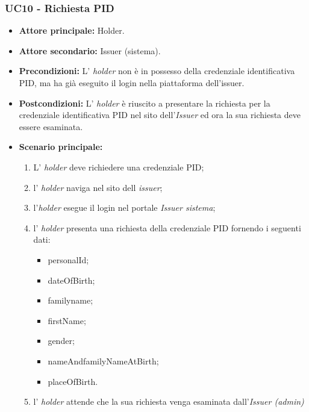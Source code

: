 \subsubsection{UC10 - Richiesta PID}
\begin{itemize}
\item \textbf{Attore principale:} Holder.
\item \textbf{Attore secondario:} Issuer (sistema). 
\item \textbf{Precondizioni:} L’ \textit{holder} non è in possesso della credenziale identificativa PID, ma ha già eseguito il login nella piattaforma dell'issuer.
\item \textbf{Postcondizioni:} L’ \textit{holder} è riuscito a presentare la richiesta per la credenziale identificativa PID nel sito dell'\textit{Issuer} ed ora la sua richiesta deve essere esaminata.
\item \textbf{Scenario principale:} 
    \begin{enumerate}
        \item L' \textit{holder} deve richiedere una credenziale PID; 
        \item l' \textit{holder} naviga nel sito dell \textit{issuer};
        \item l'\textit{holder} esegue il login nel portale \textit{Issuer sistema};
        \item l' \textit{holder} presenta una richiesta della credenziale PID fornendo i seguenti dati:
        \begin{itemize}
            \item personalId;
            \item dateOfBirth;
            \item familyname;
            \item firstName;
            \item gender;
            \item nameAndfamilyNameAtBirth;
            \item placeOfBirth.
        \end{itemize}
        \item l' \textit{holder} attende che la sua richiesta venga esaminata dall'\textit{Issuer (admin)}
    \end{enumerate}
\end{itemize}

